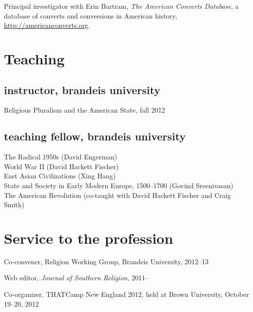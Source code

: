\documentclass[11pt]{article}
\begin{document}
Principal investigator with Erin Bartram, \emph{The American Converts 
Database}, a database of converts and conversions in American history, 
\href{http://americanconverts.org}{http://americanconverts.org}.

\section{Teaching}

\subsection{instructor, brandeis university}

Religious Pluralism and the American State, fall 2012

\subsection{teaching fellow, brandeis university}

The Radical 1950s (David Engerman)\\
World War II (David Hackett Fischer)\\
East Asian Civilizations (Xing Hang)\\
State and Society in Early Modern Europe, 1500--1700
(Govind Sreenivasan)\\
The American Revolution (co-taught with David Hackett 
Fischer and Craig Smith)



\section{Service to the profession}

Co-convener, Religion Working Group, Brandeis University, 
2012--13

Web editor, \emph{Journal of Southern Religion}, 2011--

Co-organizer, THATCamp New England 2012, held at Brown University,
October 19--20, 2012
\end{document}
